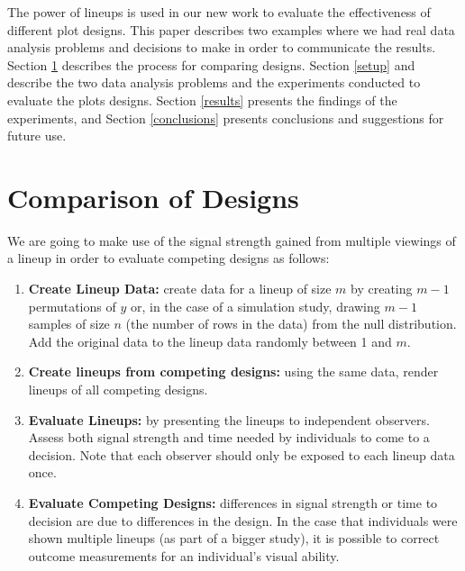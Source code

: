 %
%
% 

The power of lineups is used in our new work to evaluate the effectiveness of different plot designs. This paper describes two examples where we had real data analysis problems and decisions to make in order to communicate the results. Section \ref{designs} describes the process for comparing designs. Section \ref{setup} and describe the two data analysis problems and the experiments conducted to evaluate the plots designs. Section \ref{results} presents the findings of the experiments, and Section \ref{conclusions} presents conclusions and suggestions for future use.

\section{Comparison of Designs}\label{designs}
We are going to make use of the signal strength gained from multiple viewings of a lineup in order to evaluate competing designs as follows:
\begin{enumerate}
\item{{\bf Create Lineup Data:} create data for a lineup of size $m$ by  creating  $m-1$ permutations of $y$ or, in the case of a simulation study, drawing $m-1$ samples of size $n$ (the number of rows in the data) from the null distribution. Add the original data to the lineup data randomly between 1 and $m$. }
\item{{\bf Create lineups from competing designs:} using the same data, render lineups of all competing designs. }
\item{{\bf Evaluate Lineups:} by presenting the lineups to independent observers. Assess both signal strength and time needed by individuals to come to a decision. Note that each observer should only be exposed to each lineup data once.}
\item{{\bf Evaluate Competing Designs:} differences in signal strength or time to decision are due to differences in the design. In the case that individuals were shown multiple lineups (as part of a bigger study), it is possible to correct outcome measurements for an individual's visual ability. }
\end{enumerate}

